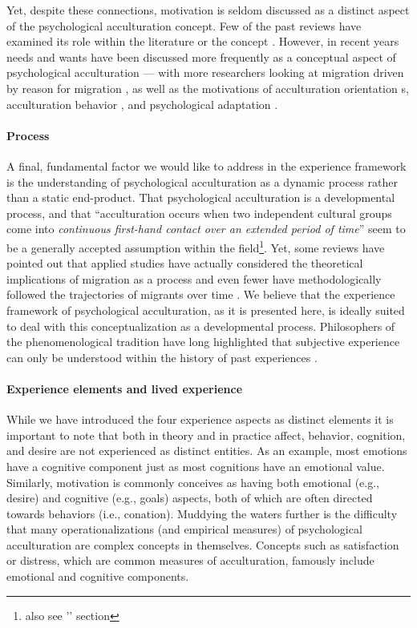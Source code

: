 \documentclass[nobib]{tufte-handout}
\begin{document}
Yet, despite these connections, motivation is seldom discussed as a distinct aspect of the psychological acculturation concept. Few of the past reviews have examined its role within the literature or the concept \citep[including, ][]{Ward2001a, Ward2019}. However, in recent years needs and wants have been discussed more frequently as a conceptual aspect of psychological acculturation --- with more researchers looking at migration driven by reason for migration \citep{Sandu2018}, as well as the motivations of acculturation orientation s\citep{Recker2017a}, acculturation behavior \citep{Reece2000}, and psychological adaptation \citep{Safdar2003}. 

\paragraph{Process}
A final, fundamental factor we would like to address in the experience framework is the understanding of psychological acculturation as a dynamic process rather than a static end-product. That psychological acculturation is a developmental process, and that ``acculturation occurs when two independent cultural groups come into \textit{continuous first-hand contact over an extended period of time}'' \citep[][186]{Berry1989} seem to be a generally accepted assumption within the field\footnote{also see '' section}. Yet, some reviews have pointed out that applied studies have actually considered the theoretical implications of migration as a process and even fewer have methodologically followed the trajectories of migrants over time \citep[e.g.,][]{Brown2011, Ward2019}. We believe that the experience framework of psychological acculturation, as it is presented here, is ideally suited to deal with this conceptualization as a developmental process. Philosophers of the phenomenological tradition have long highlighted that subjective experience can only be understood within the history of past experiences \citep[e.g.,][]{Heidegger1867}. 

\paragraph{Experience elements and lived experience}
While we have introduced the four experience aspects as distinct elements it is important to note that both in theory and in practice affect, behavior, cognition, and desire are not experienced as distinct entities. As an example, most emotions have a cognitive component just as most cognitions have an emotional value. Similarly, motivation is commonly conceives as having both emotional (e.g., desire) and cognitive (e.g., goals) aspects, both of which are often directed towards behaviors (i.e., conation). Muddying the waters further is the difficulty that many operationalizations (and empirical measures) of psychological acculturation are complex concepts in themselves. Concepts such as satisfaction or distress, which are common measures of acculturation, famously include emotional and cognitive components. 
\end{document}
